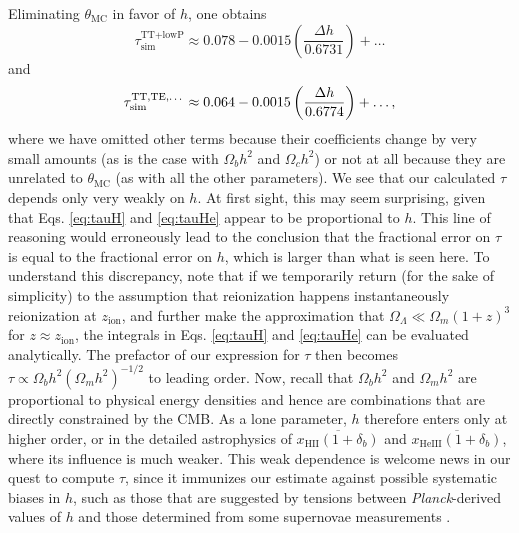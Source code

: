 \documentclass[twocolumn,aps,prd,nofootinbib,showpacs]{revtex4-1}
\begin{document}
Eliminating $\theta_\textrm{MC}$ in favor of $h$, one obtains
\begin{equation}
\tau_\textrm{sim}^\textrm{TT+lowP} \approx 0.078  -0.0015 \left(\frac{\Delta h}{0.6731}\right) + \dots 
\end{equation}
and
\begin{equation}
\tau_\textrm{sim}^\textrm{TT,TE,\dots} \approx 0.064  -0.0015 \left(\frac{\Delta h}{0.6774}\right) + \dots ,
\end{equation}
where we have omitted other terms because their coefficients change by very small amounts (as is the case with $\Omega_b h^2$ and $\Omega_c h^2$) or not at all because they are unrelated to $\theta_\textrm{MC}$ (as with all the other parameters). We see that our calculated $\tau$ depends only very weakly on $h$. At first sight, this may seem surprising, given that Eqs. \eqref{eq:tauH} and \eqref{eq:tauHe} appear to be proportional to $h$. This line of reasoning would erroneously lead to the conclusion that the fractional error on $\tau$ is equal to the fractional error on $h$, which is larger than what is seen here. To understand this discrepancy, note that if we temporarily return (for the sake of simplicity) to the assumption that reionization happens instantaneously reionization at $z_\textrm{ion}$, and further make the approximation that $\Omega_\Lambda \ll \Omega_m (1+z)^3$ for $z \approx z_\textrm{ion}$, the integrals in Eqs. \eqref{eq:tauH} and \eqref{eq:tauHe} can be evaluated analytically. The prefactor of our expression for $\tau$ then becomes $\tau \propto \Omega_b h^2(\Omega_m h^2)^{-1/2}$ to leading order. Now, recall that $\Omega_b h^2$ and $\Omega_m h^2$ are proportional to physical energy densities and hence are combinations that are directly constrained by the CMB. As a lone parameter, $h$ therefore enters only at higher order, or in the detailed astrophysics of $\overline{x_\textrm{HII} (1+\delta_b)}$ and $\overline{x_\textrm{HeIII} (1+\delta_b)}$, where its influence is much weaker. This weak dependence is welcome news in our quest to compute $\tau$, since it immunizes our estimate against possible systematic biases in $h$, such as those that are suggested by tensions between \emph{Planck}-derived values of $h$ and those determined from some supernovae measurements \cite{riess_et_al2011,bennett_et_al2014,Planck2015parameters}.
\end{document}
